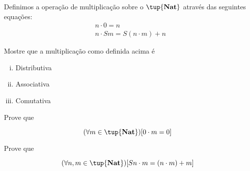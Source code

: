 \begin{definition}
    Definimos a operação de multiplicação sobre o $\tup{\textbf{Nat}}$
    através das seguintes equações:
    \begin{align*}
        &n \cdot 0 = n\tag{m1} \\
        &n \cdot Sm = S(n \cdot m) + n\tag{m2}
    \end{align*}

\end{definition}

\begin{exercise}
    Mostre que a multiplicação como definida acima é
    \begin{enumerate}[(i)]
        \item Distributiva
        \item Associativa
        \item Comutativa
    \end{enumerate}
\end{exercise}

\begin{homework}
    Prove que

    $$ (\forall m \in \tup{\textbf{Nat}})[0 \cdot m = 0] $$
\end{homework}

\begin{homework}
    Prove que

    $$ (\forall n,m \in \tup{\textbf{Nat}})[Sn \cdot m = (n \cdot m) + m] $$
\end{homework}
